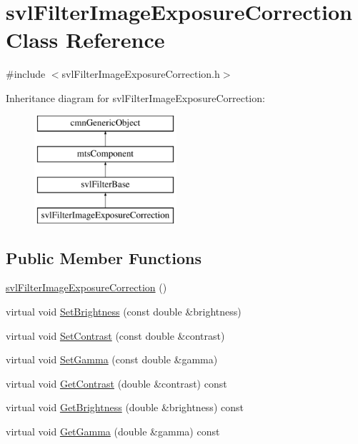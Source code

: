 \hypertarget{classsvl_filter_image_exposure_correction}{\section{svl\-Filter\-Image\-Exposure\-Correction Class Reference}
\label{classsvl_filter_image_exposure_correction}
}


{\ttfamily \#include $<$svl\-Filter\-Image\-Exposure\-Correction.\-h$>$}

Inheritance diagram for svl\-Filter\-Image\-Exposure\-Correction\-:\begin{figure}[H]
\begin{center}
\leavevmode
\includegraphics[height=4.000000cm]{d7/d67/classsvl_filter_image_exposure_correction}
\end{center}
\end{figure}
\subsection*{Public Member Functions}
\begin{DoxyCompactItemize}
\item 
\hyperlink{classsvl_filter_image_exposure_correction_acd892bb66f257297e11518d2b93706b1}{svl\-Filter\-Image\-Exposure\-Correction} ()
\item 
virtual void \hyperlink{classsvl_filter_image_exposure_correction_a09f3aa4f9f29dbde3fb1ed565c737904}{Set\-Brightness} (const double \&brightness)
\item 
virtual void \hyperlink{classsvl_filter_image_exposure_correction_a8a4f40967e8abc49934d4e514f09a166}{Set\-Contrast} (const double \&contrast)
\item 
virtual void \hyperlink{classsvl_filter_image_exposure_correction_a44913ba8e0aaa21de0c90f72a51f4795}{Set\-Gamma} (const double \&gamma)
\item 
virtual void \hyperlink{classsvl_filter_image_exposure_correction_a2506c87f18f13186251e9b509e988e46}{Get\-Contrast} (double \&contrast) const 
\item 
virtual void \hyperlink{classsvl_filter_image_exposure_correction_a3ed1e0a4605433b521314a4c3be08ed9}{Get\-Brightness} (double \&brightness) const 
\item 
virtual void \hyperlink{classsvl_filter_image_exposure_correction_a7ed624936a28e3560c6c7c396c2f72c1}{Get\-Gamma} (double \&gamma) const 
\end{DoxyCompactItemize}
